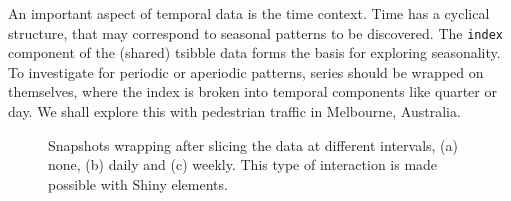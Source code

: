 An important aspect of temporal data is the time context. Time has a
cyclical structure, that may correspond to seasonal patterns to be
discovered. The \texttt{index} component of the (shared) tsibble data
forms the basis for exploring seasonality. To investigate for periodic
or aperiodic patterns, series should be wrapped on themselves, where the
index is broken into temporal components like quarter or day. We shall
explore this with pedestrian traffic in Melbourne, Australia.

\begin{Schunk}
\begin{figure}

{\centering {}\newline{}\newline{}

}

\caption[Snapshots wrapping after slicing the  data at different intervals, (a) none, (b) daily and (c) weekly]{Snapshots wrapping after slicing the  data at different intervals, (a) none, (b) daily and (c) weekly. This type of interaction is made possible with Shiny elements.}\label{fig:wrap-ped}
\end{figure}
\end{Schunk}

